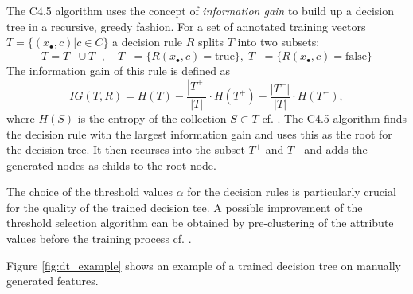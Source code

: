 The C4.5 algorithm uses the concept of {\it information gain} to build
up a decision tree in a recursive, greedy fashion.  For a set of
annotated training vectors $T = \{ (x_\bullet, c) | c \in C \}$ a
decision rule $R$ splits $T$ into two subsets:
\[ T = T^+ \cup T^{-}, \quad T^+ = \{ R(x_\bullet, c) = \text{true}\}, \;
T^- = \{ R(x_\bullet, c) = \text{false} \} \]
The information gain of this rule is defined as 
\[ IG(T,R) = H(T) - \frac{|T^+|}{|T|} \cdot H(T^+) - \frac{|T^-|}{|T|} \cdot H(T^-), \]
where $H(S)$ is the entropy of the collection $S \subset T$
cf. \cite{Shannon1948}. The C4.5 algorithm finds the decision rule
with the largest information gain and uses this as the root for the
decision tree. It then recurses into the subset $T^+$ and $T^-$ and
adds the generated nodes as childs to the root node.

The choice of the threshold values $\alpha$ for the decision rules is
particularly crucial for the quality of the trained decision tee. A
possible improvement of the threshold selection algorithm can be
obtained by pre-clustering of the attribute values before the
training process cf. \cite{kotsiantis2006}.

Figure \ref{fig:dt_example} shows an example of a trained decision
tree on manually generated features.

